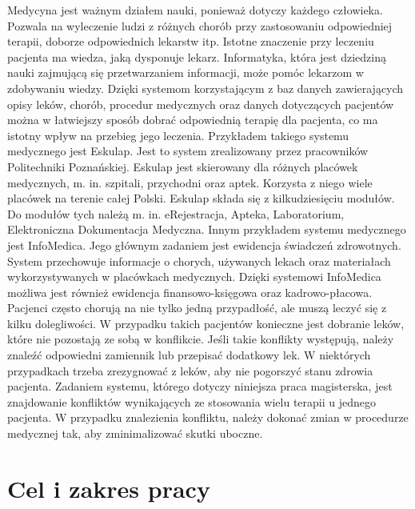 \documentclass[oneside,a4paper]{book}
\begin{document}
\begin{spacing}{1.5}
Medycyna jest ważnym działem nauki, ponieważ dotyczy każdego człowieka. Pozwala na wyleczenie ludzi z różnych chorób przy zastosowaniu odpowiedniej terapii, doborze odpowiednich lekarstw itp. Istotne znaczenie przy leczeniu pacjenta ma wiedza, jaką dysponuje lekarz. Informatyka, która jest dziedziną nauki zajmującą się przetwarzaniem informacji, może pomóc lekarzom w zdobywaniu wiedzy. Dzięki systemom korzystającym z baz danych zawierających opisy leków, chorób, procedur medycznych oraz danych dotyczących pacjentów można w łatwiejszy sposób dobrać odpowiednią terapię dla pacjenta, co ma istotny wpływ na przebieg jego leczenia. Przykładem takiego systemu medycznego jest Eskulap. Jest to system zrealizowany przez pracowników Politechniki Poznańskiej. Eskulap jest skierowany dla różnych placówek medycznych, m. in. szpitali, przychodni oraz aptek. Korzysta z niego wiele placówek na terenie całej Polski. Eskulap składa się z kilkudziesięciu modułów. Do modułów tych należą m. in. eRejestracja, Apteka, Laboratorium, Elektroniczna Dokumentacja Medyczna. Innym przykładem systemu medycznego jest InfoMedica. Jego głównym zadaniem jest ewidencja świadczeń zdrowotnych. System przechowuje informacje o chorych, używanych lekach oraz materiałach wykorzystywanych w placówkach medycznych. Dzięki systemowi InfoMedica możliwa jest również ewidencja finansowo-księgowa oraz kadrowo-płacowa. 
Pacjenci często chorują na nie tylko jedną przypadłość, ale muszą leczyć się z kilku dolegliwości. W przypadku takich pacjentów konieczne jest dobranie leków, które nie pozostają ze sobą w konflikcie. Jeśli takie konflikty występują, należy znaleźć odpowiedni zamiennik lub przepisać dodatkowy lek. W niektórych przypadkach trzeba zrezygnować z leków, aby nie pogorszyć stanu zdrowia pacjenta. Zadaniem systemu, którego dotyczy niniejsza praca magisterska, jest znajdowanie konfliktów wynikających ze stosowania wielu terapii u jednego pacjenta. W przypadku znalezienia konfliktu, należy dokonać zmian w procedurze medycznej tak, aby zminimalizować skutki uboczne. 


\section{Cel i zakres pracy}


\end{spacing}
\end{document}
